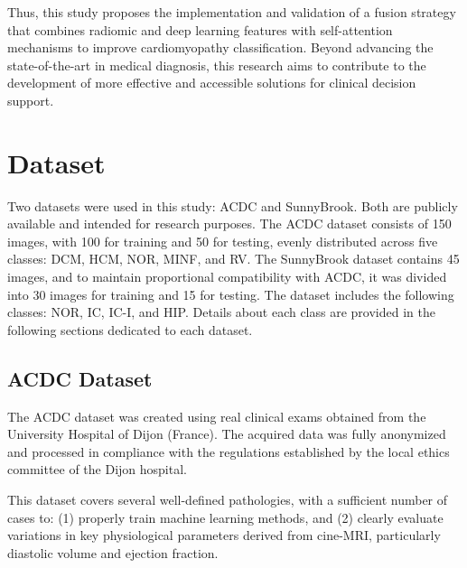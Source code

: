 \documentclass[journal,twoside,web]{ieeecolor}
\begin{document}
Thus, this study proposes the implementation and validation of a fusion strategy that combines radiomic and deep learning features with self-attention mechanisms to improve cardiomyopathy classification. Beyond advancing the state-of-the-art in medical diagnosis, this research aims to contribute to the development of more effective and accessible solutions for clinical decision support.



\section{Dataset}
Two datasets were used in this study: ACDC and SunnyBrook. Both are publicly available and intended for research purposes. The ACDC dataset consists of 150 images, with 100 for training and 50 for testing, evenly distributed across five classes: DCM, HCM, NOR, MINF, and RV. The SunnyBrook dataset contains 45 images, and to maintain proportional compatibility with ACDC, it was divided into 30 images for training and 15 for testing. The dataset includes the following classes: NOR, IC, IC-I, and HIP. Details about each class are provided in the following sections dedicated to each dataset.

\subsection{ACDC Dataset}
The ACDC dataset was created using real clinical exams obtained from the University Hospital of Dijon (France). The acquired data was fully anonymized and processed in compliance with the regulations established by the local ethics committee of the Dijon hospital.  

This dataset covers several well-defined pathologies, with a sufficient number of cases to: (1) properly train machine learning methods, and  
(2) clearly evaluate variations in key physiological parameters derived from cine-MRI, particularly diastolic volume and ejection fraction.  
\end{document}
